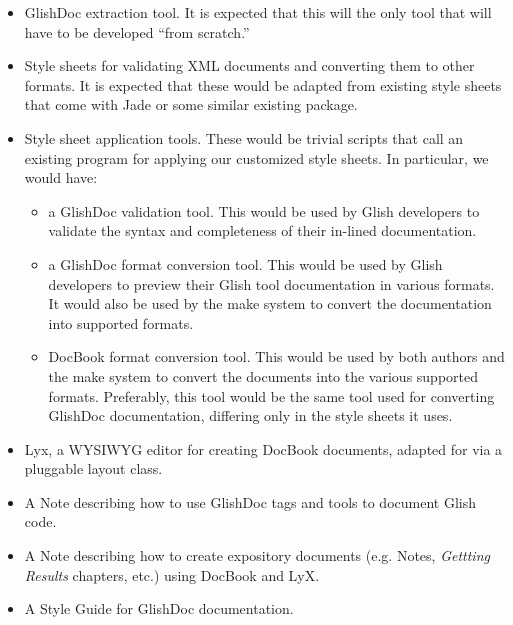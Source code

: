 \begin{itemize}

\item GlishDoc extraction tool.  It is expected that this will the only
tool that will have to be developed ``from scratch.''

\item Style sheets for validating XML documents and converting them to
other formats.  It is expected that these would be adapted from
existing style sheets that come with Jade or some similar existing
package.  

\item Style sheet application tools.  These would be trivial scripts
that call an existing program for applying our customized style
sheets.  In particular, we would have:

\begin{itemize}

\item a GlishDoc validation tool.  This would be used by Glish
developers to validate the syntax and completeness of their in-lined
documentation.  

\item a GlishDoc format conversion tool.  This would be used by Glish
developers to preview their Glish tool documentation in various
formats.  It would also be used by the \aipspp make system to convert
the documentation into supported formats.  

\item DocBook format conversion tool.  This would be used by both
authors and the \aipspp make system to convert the documents into the
various supported formats.  Preferably, this tool would be the same
tool used for converting GlishDoc documentation, differing only in the
style sheets it uses.

\end{itemize}

\item Lyx, a WYSIWYG editor for creating DocBook documents, adapted
for \aipspp via a pluggable layout class.  

\item A Note describing how to use GlishDoc tags and tools to document
Glish code.

\item A Note describing how to create expository documents
(e.g. Notes, {\it Gettting Results} chapters, etc.) using DocBook and
LyX.  

\item A Style Guide for GlishDoc documentation.

\end{itemize}


